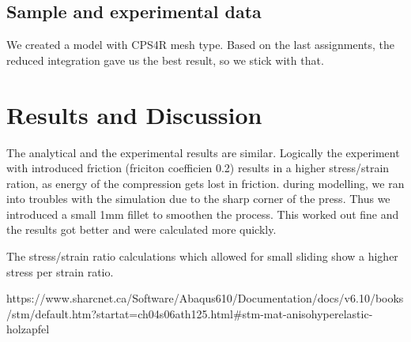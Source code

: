 \documentclass[12pt]{article}
\begin{document}
\subsection{Sample and experimental data}

We created a model with CPS4R mesh type. Based on the last assignments, the reduced integration
gave us the best result, so we stick with that.




\pagebreak
\section{Results and Discussion}

The analytical and the experimental results are similar.
Logically the experiment with introduced friction (friciton coefficien 0.2) results in a higher
stress/strain ration, as energy of the compression gets lost in friction. 
during modelling, we ran into troubles with the simulation due to the sharp corner of the press.
Thus we introduced a small 1mm fillet to smoothen the process. This worked out fine and the results 
got better and were calculated more quickly.

The stress/strain ratio calculations which allowed for small sliding show a higher stress per strain ratio.


\pagebreak
\begin{thebibliography}{9}
  https://www.sharcnet.ca/Software/Abaqus610/Documentation/docs/v6.10/books/stm/default.htm?startat=ch04s06ath125.html\#stm-mat-anisohyperelastic-holzapfel
\end{thebibliography}
\end{document}
